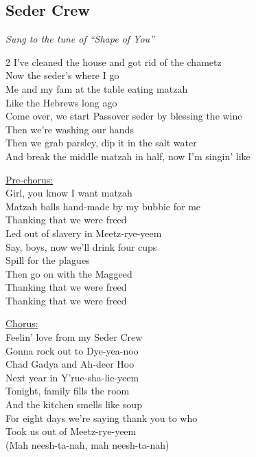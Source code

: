 \pagebreak
\subsection*{Seder Crew}
\textit{Sung to the tune of ``Shape of You''}

\begin{multicols}{2}
I've cleaned the house and got rid of the chametz \\
Now the seder's where I go \\
Me and my fam at the table eating matzah \\
Like the Hebrews long ago \\
Come over, we start Passover seder by blessing the wine \\
Then we're washing our hands \\
Then we grab parsley, dip it in the salt water \\
And break the middle matzah in half, now I'm singin' like

\begin{minipage}[t]{\linewidth}
    \underline{Pre-chorus:} \\
    Girl, you know I want matzah \\
    Matzah balls hand-made by my bubbie for me \\
    Thanking {\god} that we were freed \\
    Led out of slavery in Meetz-rye-yeem \\
    Say, boys, now we'll drink four cups \\
    Spill for the plagues \\
    Then go on with the Maggeed \\
    Thanking {\god} that we were freed \\
    Thanking {\god} that we were freed
\end{minipage}

\begin{minipage}[t]{\linewidth}
    \underline{Chorus:} \\
    Feelin' love from my Seder Crew \\
    Gonna rock out to Dye-yea-noo \\
    Chad Gadya and Ah-deer Hoo \\
    Next year in Y'rue-sha-lie-yeem \\
    Tonight, family fills the room \\
    And the kitchen smells like soup \\
    For eight days we're saying thank you to {\god} who \\
    Took us out of Meetz-rye-yeem \\
    (Mah neesh-ta-nah, mah neesh-ta-nah)
\end{minipage}


\end{multicols}
